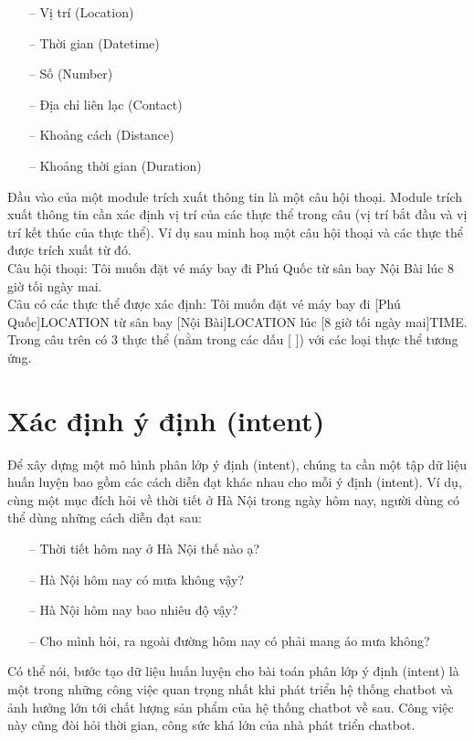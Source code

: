 \begin{enumerate}
          \begin{itemize}
              \item[--] Vị trí (Location)
              \item[--] Thời gian (Datetime)
              \item[--] Số (Number)
              \item[--] Địa chỉ liên lạc (Contact)
              \item[--] Khoảng cách (Distance)
              \item[--] Khoảng thời gian (Duration)
          \end{itemize}
          Đầu vào của một module trích xuất thông tin là một câu hội thoại. Module trích xuất thông tin cần xác định vị trí của các thực thể trong câu (vị trí bắt đầu và vị trí kết thúc của thực thể). Ví dụ sau minh hoạ một câu hội thoại và các thực thể được trích xuất từ đó.
          \\
          Câu hội thoại: Tôi muốn đặt vé máy bay đi Phú Quốc từ sân bay Nội Bài lúc 8 giờ tối ngày mai.
          \\
          Câu có các thực thể được xác định: Tôi muốn đặt vé máy bay đi [Phú Quốc]LOCATION từ sân bay [Nội Bài]LOCATION lúc [8 giờ tối ngày mai]TIME.
          \\
          Trong câu trên có 3 thực thể (nằm trong các dấu [ ]) với các loại thực thể tương ứng.
\end{enumerate}

\section{Xác định ý định (intent)}

Để xây dựng một mô hình phân lớp ý định (intent), chúng ta cần một tập dữ liệu huấn luyện bao gồm các cách diễn đạt khác nhau cho mỗi ý định (intent). Ví dụ, cùng một mục đích hỏi về thời tiết ở Hà Nội trong ngày hôm nay, người dùng có thể dùng những cách diễn đạt sau:

\begin{itemize}
    \item[--] Thời tiết hôm nay ở Hà Nội thế nào ạ?
    \item[--] Hà Nội hôm nay có mưa không vậy?
    \item[--] Hà Nội hôm nay bao nhiêu độ vậy?
    \item[--] Cho mình hỏi, ra ngoài đường hôm nay có phải mang áo mưa không?
\end{itemize}
Có thể nói, bước tạo dữ liệu huấn luyện cho bài toán phân lớp ý định (intent) là một trong những công việc quan trọng nhất khi phát triển hệ thống chatbot và ảnh hưởng lớn tới chất lượng sản phẩm của hệ thống chatbot về sau. Công việc này cũng đòi hỏi thời gian, công sức khá lớn của nhà phát triển chatbot.

